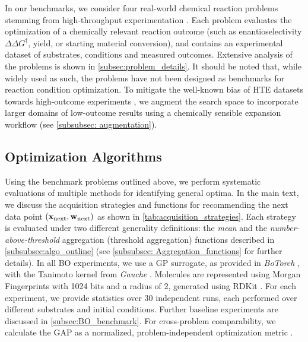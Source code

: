 In our benchmarks, we consider four real-world chemical reaction problems stemming from high-throughput experimentation \citep[HTE;][]{zahrt_prediction_2019, buitrago_santanilla_nanomole-scale_2015, nielsen_deoxyfluorination_2018, stevens_advancing_2022, wang_identifying_2024}. 
Each problem evaluates the optimization of a chemically relevant reaction outcome (such as enantioselectivity $\Delta\Delta G^{\ddagger}$, yield, or starting material conversion), and contains an experimental dataset of substrates, conditions and measured outcomes.
Extensive analysis of the problems is shown in \cref{subsec:problem_details}.
It should be noted that, while widely used as such, the problems have not been designed as benchmarks for reaction condition optimization. To mitigate the well-known bias of HTE datasets towards high-outcome experiments \citep{strieth-kalthoff_machine_2022, beker_machine_2022}, we augment the search space to incorporate larger domains of low-outcome results using a chemically sensible expansion workflow (see \cref{subsubsec: augmentation}).

\subsection{Optimization Algorithms} \label{subsec:strategies}

Using the benchmark problems outlined above, we perform systematic evaluations of multiple methods for identifying general optima.  
In the main text, we discuss the acquisition strategies and functions for recommending the next data point $({\mathbf{x}}_\text{next}, {\mathbf{w}}_\text{next})$ as shown in \cref{tab:acquisition_strategies}.
Each strategy is evaluated under two different generality definitions: the \textit{mean} and the \textit{number-above-threshold} aggregation (threshold aggregation) functions described in \cref{subsubsec:algo_outline} (see \cref{subsubsec: Aggregation_functions} for further details).
In all BO experiments, we use a GP surrogate, as provided in \textit{BoTorch} \citep{balandat_botorch_2020}, with the Tanimoto kernel from \textit{Gauche} \citep{griffiths_gauche_2023}.
Molecules are represented using Morgan Fingerprints \citep{morgan_generation_1965} with 1024 bits and a radius of 2, generated using RDKit \citep{landrum_rdkit_2023}.
For each experiment, we provide statistics over $30$ independent runs, each performed over different substrates and initial conditions. 
Further baseline experiments are discussed in \cref{subsec:BO_benchmark}.
For cross-problem comparability, we calculate the GAP as a normalized, problem-independent optimization metric \citep[GAP = $(y_k - y_0) / (y^* - y_0)$, where $y_k$  is the true generality of the recommendation at experiment $k$ and $y^*$ is the true global optimum;][]{jiang_binoculars_2020}.